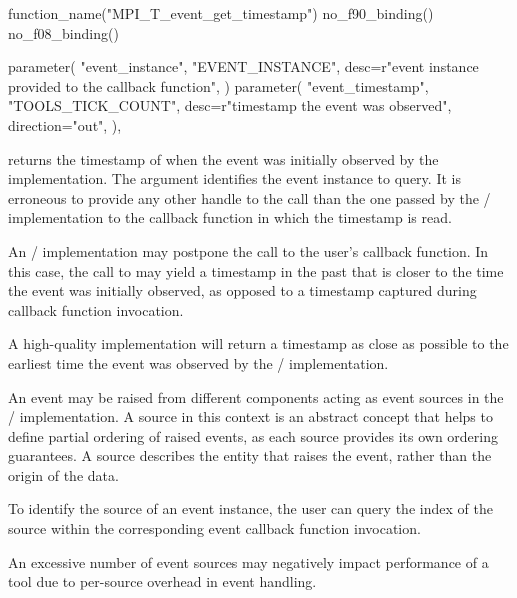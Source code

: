 \begin{mpi-binding}
    function_name("MPI_T_event_get_timestamp")
    no_f90_binding()
    no_f08_binding()

    parameter(
        "event_instance",
        "EVENT_INSTANCE",
        desc=r"event instance provided to the callback function",
    )
    parameter(
        "event_timestamp",
        "TOOLS_TICK_COUNT",
        desc=r"timestamp the event was observed",
        direction="out",
    ),
\end{mpi-binding}

 returns the timestamp of when the
event was initially observed by the implementation.  The
 argument identifies the event instance to
query. It is erroneous to provide any other handle to the call than the one
passed by the \MPI/ implementation to the callback function in which the
timestamp is read.

\begin{users}
    An \MPI/ implementation may postpone the call to the user's callback
    function.  In this case, the call to
     may yield a timestamp in the
    past that is closer to the time the event was initially observed, as
    opposed to a timestamp captured during callback function invocation.
\end{users}

\begin{implementors}
    A high-quality implementation will return a timestamp as close as possible
    to the earliest time the event was observed by the \MPI/ implementation.
\end{implementors}

An event may be raised from different components acting as event sources in
the \MPI/ implementation.  A source in this context is an abstract concept
that helps to define partial ordering of raised events, as each source
provides its own ordering guarantees. A source describes the entity that
raises the event, rather than the origin of the data.

To identify the source of an event instance, the user can query the index
of the source within the corresponding event callback
function invocation.

\begin{implementors}
    An excessive number of event sources may negatively impact performance
    of a tool due to per-source overhead in event handling.
\end{implementors}

